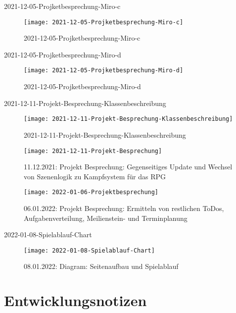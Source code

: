 2021-12-05-Projketbesprechung-Miro-c 
\begin{figure}[H]
    \centering
    \caption[]{2021-12-05-Projketbesprechung-Miro-c}
    \label{fig:2021-12-05-Projketbesprechung-Miro-c}
    \texttt{[image: 2021-12-05-Projketbesprechung-Miro-c]}
\end{figure}

2021-12-05-Projketbesprechung-Miro-d 
\begin{figure}[H]
    \centering
    \caption[]{2021-12-05-Projketbesprechung-Miro-d}
    \label{fig:2021-12-05-Projketbesprechung-Miro-d}
    \texttt{[image: 2021-12-05-Projketbesprechung-Miro-d]}
\end{figure}

2021-12-11-Projekt-Besprechung-Klassenbeschreibung 
\begin{figure}[H]
    \centering
    \caption[]{2021-12-11-Projekt-Besprechung-Klassenbeschreibung}
    \label{fig:2021-12-11-Projekt-Besprechung-Klassenbeschreibung}
    \texttt{[image: 2021-12-11-Projekt-Besprechung-Klassenbeschreibung]}
\end{figure}


\begin{figure}[H]
    \centering
    \caption[]{11.12.2021: Projekt Besprechung: Gegenseitiges Update und Wechsel von Szenenlogik zu Kampfsystem für das RPG }
    \label{fig:2021-12-11-Projekt-Besprechung}
    \texttt{[image: 2021-12-11-Projekt-Besprechung]}
\end{figure}


\begin{figure}[H]
    \centering
    \caption[]{06.01.2022: Projekt Besprechung: Ermitteln von restlichen ToDos, Aufgabenverteilung, Meilienstein- und Terminplanung}
    \label{fig:2022-01-06-Projektbesprechung}
    \texttt{[image: 2022-01-06-Projektbesprechung]}
\end{figure}

2022-01-08-Spielablauf-Chart
\begin{figure}[H]
    \centering
    \caption[]{08.01.2022: Diagram: Seitenaufbau und Spielablauf}
    \label{fig:2022-01-08-Spielablauf-Chart}
    \texttt{[image: 2022-01-08-Spielablauf-Chart]}
\end{figure}




\section{Entwicklungsnotizen}


